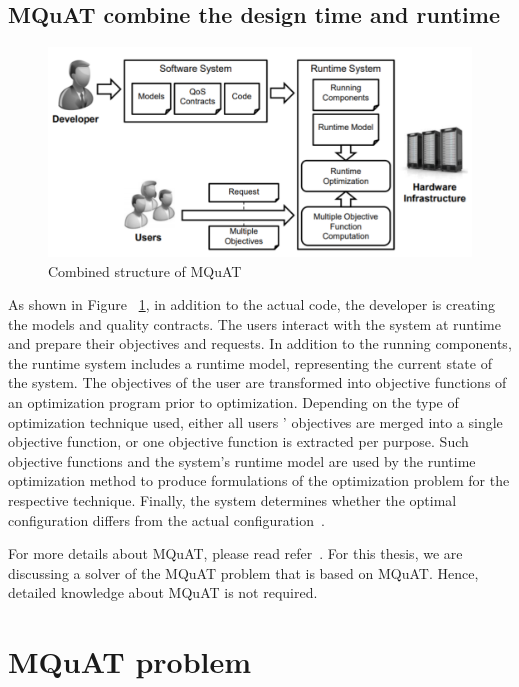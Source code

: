 \subsection{MQuAT combine the design time and runtime}

\begin{figure}
	\centering
	\includegraphics[width=\textwidth]{images/CombinedMQuAT}
	\caption[Combined structure of MQuAT]{Combined structure of MQuAT}
	\label{fig:CombinedMQuAT}
\end{figure}

As shown in Figure ~\ref{fig:CombinedMQuAT}, in addition to the actual code, the developer is creating the models and quality contracts. The users interact with the system at runtime and prepare their objectives and requests. 
In addition to the running components, the runtime system includes a runtime model, representing the current state of the system. The objectives of the user are transformed into objective functions of an optimization program prior to optimization. Depending on the type of optimization technique used, either all users ' objectives are merged into a single objective function, or one objective function is extracted per purpose. Such objective functions and the system's runtime model are used by the runtime optimization method to produce formulations of the optimization problem for the respective technique. Finally, the system determines whether the optimal configuration differs from the actual configuration~\cite{gotz13, ahmad18}.

For more details about MQuAT, please read refer~\cite{gotz13}. For this thesis, we are discussing a solver of the MQuAT problem that is based on MQuAT. Hence, detailed knowledge about MQuAT is not required. 


\section{MQuAT problem}

